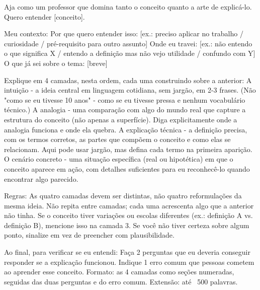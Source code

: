 \documentclass[11pt, a4paper]{article}
\begin{document}
\begin{promptbox}
Aja como um professor que domina tanto o conceito quanto a arte de explicá-lo. Quero entender [conceito].

Meu contexto:
 Por que quero entender isso: [ex.: preciso aplicar no trabalho / curiosidade / pré-requisito para outro assunto]
 Onde eu travei: [ex.: não entendo o que significa X / entendo a definição mas não vejo utilidade / confundo com Y]
 O que já sei sobre o tema: [breve]

Explique em 4 camadas, nesta ordem, cada uma construindo sobre a anterior:
 A intuição - a ideia central em linguagem cotidiana, sem jargão, em 2-3 frases. (Não "como se eu tivesse 10 anos" - como se eu tivesse pressa e nenhum vocabulário técnico.)
 A analogia - uma comparação com algo do mundo real que capture a estrutura do conceito (não apenas a superfície). Diga explicitamente onde a analogia funciona e onde ela quebra.
 A explicação técnica - a definição precisa, com os termos corretos, as partes que compõem o conceito e como elas se relacionam. Aqui pode usar jargão, mas defina cada termo na primeira aparição.
 O cenário concreto - uma situação específica (real ou hipotética) em que o conceito aparece em ação, com detalhes suficientes para eu reconhecê-lo quando encontrar algo parecido.

Regras:
 As quatro camadas devem ser distintas, não quatro reformulações da mesma ideia.
 Não repita entre camadas; cada uma acrescenta algo que a anterior não tinha.
 Se o conceito tiver variações ou escolas diferentes (ex.: definição A vs. definição B), mencione isso na camada 3.
 Se você não tiver certeza sobre algum ponto, sinalize em vez de preencher com plausibilidade.

Ao final, para verificar se eu entendi:
 Faça 2 perguntas que eu deveria conseguir responder se a explicação funcionou.
 Indique 1 erro comum que pessoas cometem ao aprender esse conceito.
 Formato: as 4 camadas como seções numeradas, seguidas das duas perguntas e do erro comum. Extensão: até ~500 palavras.
\end{promptbox}
\end{document}
